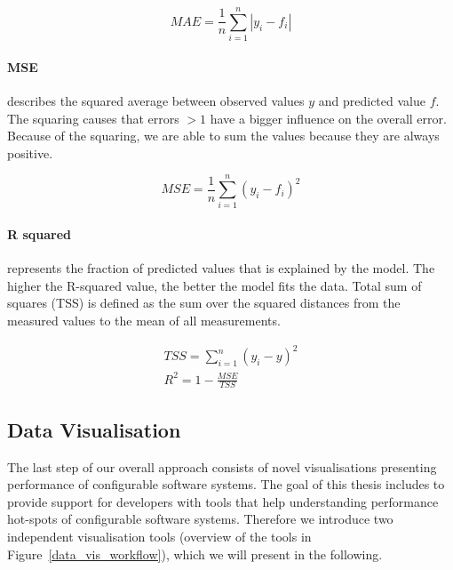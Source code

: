\begin{equation}
    \label{def:mea}
    MAE=\frac{1}{n}\sum_{i=1}^n|y_i-f_i|
\end{equation}

\paragraph{\ac{MSE}} 
describes the squared average between observed values $y$ and predicted value $f$. The squaring causes that errors $>1$ have a bigger influence on the overall error. Because of the squaring, we are able to sum the values because they are always positive.

\begin{equation}
    \label{def:mse}
    MSE=\frac{1}{n}\sum_{i=1}^n(y_i-f_i)^2
\end{equation}

\paragraph{R squared} 
represents the fraction of predicted values that is explained by the model. The higher the R-squared value, the better the model fits the data. Total sum of squares (TSS) is defined as the sum over the squared distances from the measured values to the mean of all measurements.

\begin{equation}
    \begin{aligned}
        \label{def:RSqu}
        TSS=\sum_{i=1}^n(y_i-y)^2
        \\
        R^2=1-\frac{MSE}{TSS}
    \end{aligned}
\end{equation}


\subsection{Data Visualisation}
\label{visualisation}

The last step of our overall approach consists of novel visualisations presenting performance of configurable software systems. The goal of this thesis includes to provide support for developers with tools that help understanding performance hot-spots of configurable software systems. Therefore we introduce two independent visualisation tools (overview of the tools in Figure~\ref{data_vis_workflow}), which we will present in the following.

